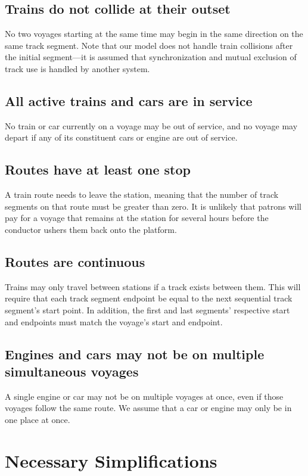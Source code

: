 \documentclass[a4paper]{article}
\begin{document}
\subsection*{Trains do not collide at their outset}
No two voyages starting at the same time may begin in the same direction on the same track segment. Note that our model does not handle train collisions after the initial segment—it is assumed that synchronization and mutual exclusion of track use is handled by another system.

\subsection*{All active trains and cars are in service}
No train or car currently on a voyage may be out of service, and no voyage may depart if any of its constituent cars or engine are out of service.

\subsection*{Routes have at least one stop}
A train route needs to leave the station, meaning that the number of track segments on that route must be greater than zero. It is unlikely that patrons will pay for a voyage that remains at the station for several hours before the conductor ushers them back onto the platform.

\subsection*{Routes are continuous}
Trains may only travel between stations if a track exists between them. This will require that each track segment endpoint be equal to the next sequential track segment’s start point. In addition, the first and last segments’ respective start and endpoints must match the voyage’s start and endpoint.

\subsection*{Engines and cars may not be on multiple simultaneous voyages}
A single engine or car may not be on multiple voyages at once, even if those voyages follow the same route. We assume that a car or engine may only be in one place at once.


\section{Necessary Simplifications}
\end{document}

